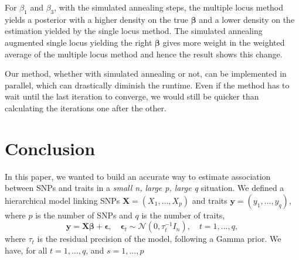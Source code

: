 \documentclass[a4paper, 11pt]{report}
\numberwithin{equation}{chapter}
\begin{document}

For $\beta_1$ and $\beta_3$, with the simulated annealing steps, the multiple locus method yields a posterior with a higher density on the true $\boldsymbol{\beta}$ and a lower density on the estimation yielded by the single locus method. The simulated annealing augmented single locus yielding the right $\boldsymbol{\beta}$ gives more weight in the weighted average of the multiple locus method and hence the result shows this change.

Our method, whether with simulated annealing or not, can be implemented in parallel, which can drastically diminish the runtime. Even if the method has to wait until the last iteration to converge, we would still be quicker than calculating the iterations one after the other.

%
%
%
%
%
%
\newpage
\chapter{Conclusion}
In this paper, we wanted to build an accurate way to estimate association between SNPs and traits in a \textit{small n, large p, large q} situation. We defined a hierarchical model linking SNPs $\boldsymbol{X} = (X_1,\dots,X_p)$ and traits $\boldsymbol{y} = (y_1, \dots, y_q)$, where $p$ is the number of SNPs and $q$ is the number of traits,
$$
\boldsymbol{y} = \boldsymbol{X\beta} + \boldsymbol{\epsilon},\quad \boldsymbol{\epsilon}_t \sim \mathcal{N}\left(0,\tau_t^{-1}I_n\right), \quad t=1,\dots,q,
$$
where $\tau_t$ is the residual precision of the model, following a Gamma prior. We have, for all $t = 1,\dots, q$, and $s=1,\dots,p$
\end{document}
